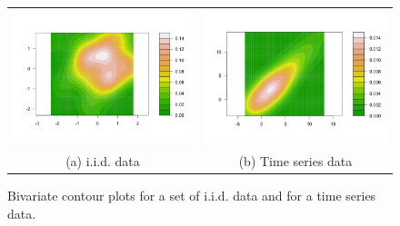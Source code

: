 \begin{figure}
\begin{center}
\begin{tabular}{cc}
\includegraphics[scale=0.25]{./figures/BivariateGaussian} &
\includegraphics[scale=0.25]{./figures/BivariateTimeSerie} \\
(a) i.i.d. data & (b)  Time series data \\
\end{tabular}
\caption{\label{Figure:PreliminariesBivariates}Bivariate contour plots for a set of i.i.d. data and for a time series data. 
}
\end{center}
\end{figure}
